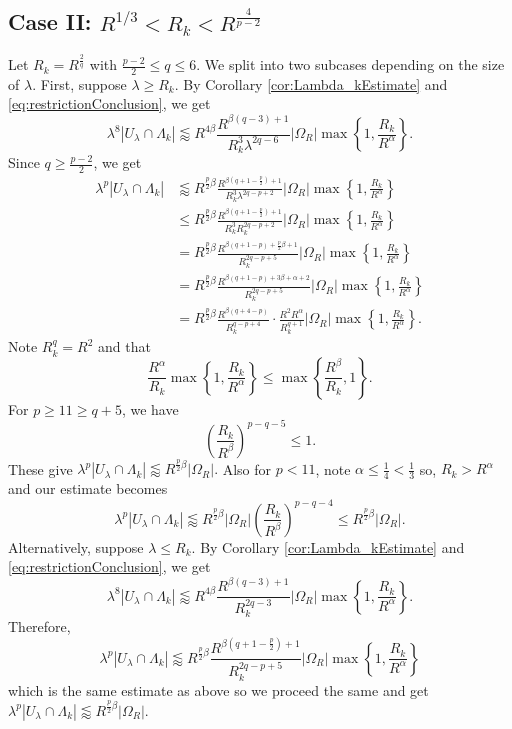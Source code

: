 \documentclass[12pt]{amsart}
\begin{document}
\subsection{Case II: $R^{1/3}<R_k<R^{\frac{4}{p-2}}$} Let $R_k= R^{\frac{2}{q}}$ with $\frac{p-2}{2}\le q\le 6$. We split into two subcases depending on the size of $\lambda$. First, suppose $\lambda\ge R_k$. By Corollary \ref{cor:Lambda_kEstimate} and \eqref{eq:restrictionConclusion}, we get $$\lambda^8|U_\lambda\cap \Lambda_k|\lessapprox R^{4\beta}\frac{R^{\beta(q-3)+1}}{R_k^3\lambda^{2q-6}}|\Omega_R|\max\left\{1, \frac{R_k}{R^\alpha}\right\}.$$ Since $q\ge \frac{p-2}{2}$, we get \begin{align*}
    \lambda^p|U_\lambda\cap \Lambda_k|&\lessapprox R^{\frac{p}{2}\beta}\frac{R^{\beta(q+1-\frac{p}{2})+1}}{R_k^3\lambda^{2q-p+2}}|\Omega_R|\max\left\{1, \frac{R_k}{R^\alpha}\right\}\\
    &\le R^{\frac{p}{2}\beta}\frac{R^{\beta(q+1-\frac{p}{2})+1}}{R_k^3R_k^{2q-p+2}}|\Omega_R|\max\left\{1, \frac{R_k}{R^\alpha}\right\}\\
    &=R^{\frac{p}{2}\beta}\frac{R^{\beta(q+1-p)+\frac{p}{2}\beta+1}}{R_k^{2q-p+5}}|\Omega_R|\max\left\{1, \frac{R_k}{R^\alpha}\right\}\\
    &=R^{\frac{p}{2}\beta}\frac{R^{\beta(q+1-p)+3\beta+\alpha+2}}{R_k^{2q-p+5}}|\Omega_R|\max\left\{1, \frac{R_k}{R^\alpha}\right\}\\
    &= R^{\frac{p}{2}\beta}\frac{R^{\beta(q+4-p)}}{R_k^{q-p+4}}\cdot \frac{R^2R^\alpha}{R_k^{q+1}}|\Omega_R|\max\left\{1, \frac{R_k}{R^\alpha}\right\}.
\end{align*} Note $R_k^q = R^2$ and that $$\frac{R^\alpha}{R_k}\max\left\{1, \frac{R_k}{R^\alpha}\right\}\le \max\left\{\frac{R^\beta}{R_k}, 1\right\}.$$ For $p\ge 11\ge q+5$, we have $$\left(\frac{R_k}{R^\beta}\right)^{p-q-5}\le 1.$$ These give $\lambda^p|U_\lambda\cap \Lambda_k|\lessapprox R^{\frac{p}{2}\beta}|\Omega_R|.$ Also for $p<11$, note $\alpha\le \frac{1}{4}<\frac{1}{3}$ so, $R_k>R^{\alpha}$ and our estimate becomes $$\lambda^p|U_\lambda\cap \Lambda_k|\lessapprox R^{\frac{p}{2}\beta}|\Omega_R| \left(\frac{R_k}{R^\beta}\right)^{p-q-4}\le R^{\frac{p}{2}\beta}|\Omega_R|. $$
%
Alternatively, suppose $\lambda\le R_k$.  By Corollary \ref{cor:Lambda_kEstimate} and \eqref{eq:restrictionConclusion}, we get $$\lambda^8|U_\lambda\cap \Lambda_k|\lessapprox R^{4\beta}\frac{R^{\beta(q-3)+1}}{R_k^{2q-3}}|\Omega_R|\max\left\{1, \frac{R_k}{R^\alpha}\right\}.$$ Therefore, $$\lambda^p|U_\lambda\cap \Lambda_k|\lessapprox R^{\frac{p}{2}\beta}\frac{R^{\beta(q+1-\frac{p}{2})+1}}{R_k^{2q-p+5}}|\Omega_R|\max\left\{1, \frac{R_k}{R^\alpha}\right\}$$ which is the same estimate as above so we proceed the same and get $\lambda^p|U_\lambda\cap \Lambda_k|\lessapprox R^{\frac{p}{2}\beta}|\Omega_R|.$
\end{document}
